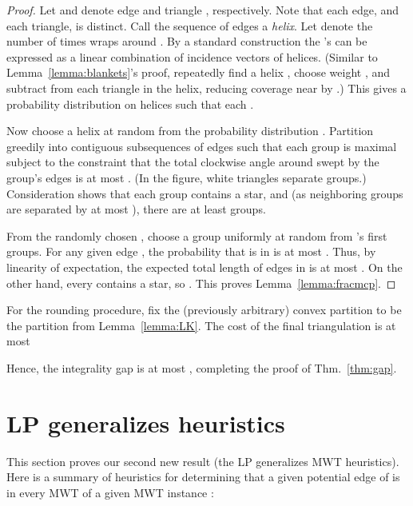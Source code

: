 \documentclass[final]{siamltex}
\newcommand{\qed}{\endproof}
\begin{document}
\begin{proof}
  Let  and  denote edge  
  and triangle , respectively.
  Note that each edge, and each triangle, is distinct.
  Call the sequence of edges  a {\em helix}.
  Let  denote the number of times  wraps around .
  By a standard construction
the 's 
  can be expressed as a linear combination of incidence vectors of helices.
  (Similar to Lemma~\ref{lemma:blankets}'s proof,
  repeatedly find a helix , choose weight ,
  and subtract  from each triangle  in the helix,
  reducing coverage near  by .)
  This gives a probability distribution  on helices 
  such that each .

Now choose a helix  at random from the probability distribution .
  Partition  greedily into contiguous subsequences of edges such that each
  group  is maximal subject to the constraint that the total clockwise angle around 
  swept by the group's edges is at most .
  (In the figure, white triangles separate groups.)
  Consideration shows that each group contains a star,
  and (as neighboring groups are separated by at most ),
  there are at least  groups.

  From the randomly chosen , choose a group  uniformly at random 
  from 's first  groups.
  For any given edge , the probability that  is in  is at most
  .
  Thus, by linearity of expectation, the expected total length  of edges in  
  is at most .
  On the other hand, every  contains a star, so .
  This proves Lemma~\ref{lemma:fracmcp}.
\end{proof}

For the rounding procedure,
fix the (previously arbitrary) convex partition  
to be the partition  from Lemma~\ref{lemma:LK}.
The cost of the final triangulation is at most

Hence, the integrality gap is at most ,
completing the proof of Thm.~\ref{thm:gap}.
\qed





\section{LP generalizes heuristics}\label{sec:heuristics}

This section proves our second new result 
(the LP generalizes MWT heuristics).
Here is a summary of heuristics for determining that 
a given potential edge  of  is in every MWT 
of a given MWT instance :

\newcommand{\thing}[2]{\smallskip \par\item[#1]{#2}}
\end{document}
